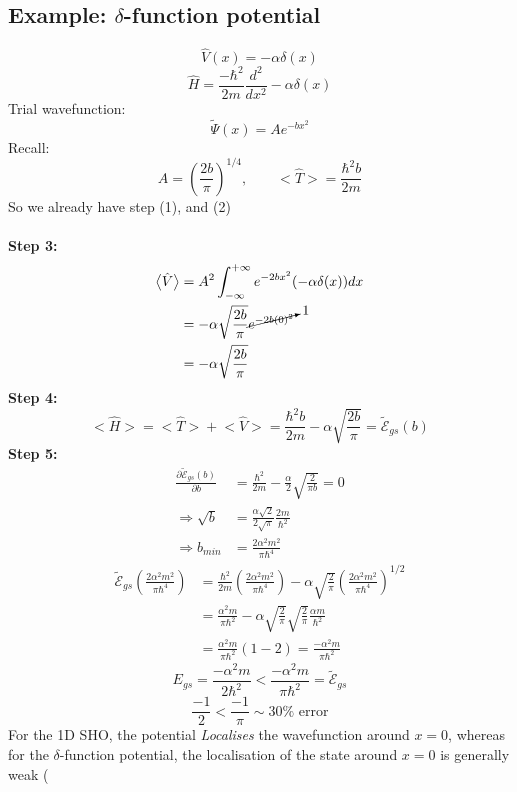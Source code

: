 \documentclass[12pt,fancychapters]{report}
\numberwithin{equation}{section}
\begin{document}
\subsection{Example: $\delta$-function potential}
\[
  \hat{V}(x)= -\alpha\delta (x)
\]
\[
  \hat{H} = \frac{-\hbar^2}{2m}\frac{d^2}{dx^2} - \alpha\delta(x)
\]
Trial wavefunction:
\[
  \tilde{\Psi}(x) = Ae^{-bx^2}
\]
Recall: 
\[
  A = \left(\frac{2b}{\pi}\right)^{1/4}, \qquad \big<\hat{T}\big> = \frac{\hbar^2b}{2m}
\]
So we already have step (1), and (2)\\
\\
\textbf{Step 3:}
\begin{align*}
  \big<\hat{V}\big> &= A^2\int_{-\infty}^{+\infty} e^{-2bx^2}(-\alpha \delta(x))dx\\
                    &= -\alpha \sqrt{\frac{2b}{\pi}}\cancelto{1}{e^{-2b(0)^2}}\\
                    &= -\alpha\sqrt{\frac{2b}{\pi}}
\end{align*}
\textbf{Step 4:}
\[
  \big<\hat{H}\big> = \big<\hat{T}\big>+\big<\hat{V}\big> = 
  \frac{\hbar^2 b}{2m} - \alpha\sqrt{\frac{2b}{\pi}} = \tilde{\mathcal{E}}_{gs}(b)
\]
\textbf{Step 5:}
\begin{align*}
  \frac{\partial \tilde{\mathcal{E}}_{gs}(b)}{\partial b} &= \frac{\hbar^2}{2m} -
  \frac{\alpha}{2}\sqrt{\frac{2}{\pi b}} = 0\\
  \Rightarrow \sqrt{b} &= \frac{\alpha\sqrt{2}}{2\sqrt{\pi}}\frac{2m}{\hbar^2}\\
  \Rightarrow b_{min} &= \frac{2\alpha^2 m^2}{\pi \hbar^4}
\end{align*}
\begin{align*}
  \tilde{\mathcal{E}}_{gs}\left(  \frac{2\alpha^2 m^2}{\pi \hbar^4}\right) 
  &= \frac{\hbar^2}{2m}\left( \frac{2\alpha^2 m^2}{\pi \hbar^4}\right)
  - \alpha\sqrt{\frac{2}{\pi}}\left( \frac{2\alpha^2 m^2}{\pi \hbar^4}\right)^{1/2}\\
  &= \frac{\alpha^2 m}{\pi \hbar^2} - \alpha\sqrt{\frac{2}{\pi}}\sqrt{\frac{2}{\pi}}
  \frac{\alpha m}{\hbar^2}\\
  &= \frac{\alpha^2 m}{\pi \hbar^2}\left(1-2\right) = \frac{-\alpha^2 m}{\pi \hbar^2}
\end{align*}
\[
  E_{gs} = \frac{-\alpha^2 m}{2\hbar^2} < \frac{-\alpha^2 m}{\pi \hbar^2} =
  \tilde{\mathcal{E}}_{gs}
\]
\[
  \frac{-1}{2} < \frac{-1}{\pi} \sim 30\%\,\,\text{error} 
\]
For the 1D SHO, the potential \emph{Localises} the wavefunction around $x =0$, whereas for the
$\delta$-function potential, the localisation of the state around $x=0$ is generally weak (
\end{document}
